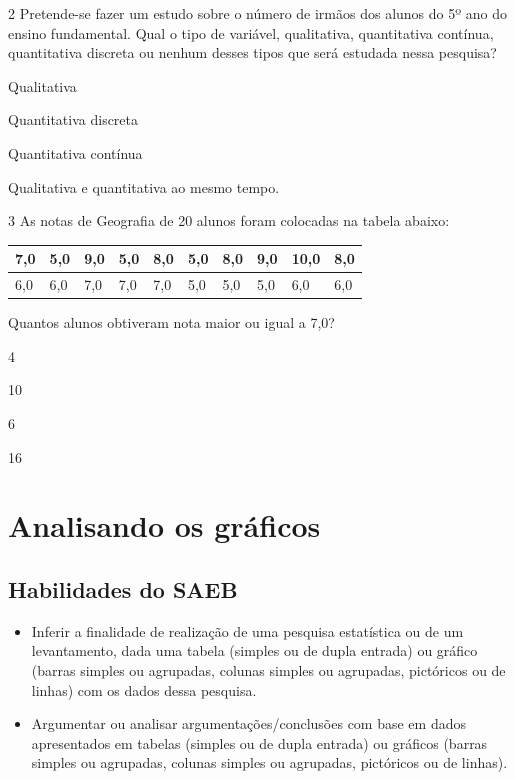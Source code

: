 \num{2} Pretende-se fazer um estudo sobre o número de irmãos dos alunos do
5º ano do ensino fundamental. Qual o tipo de variável, qualitativa,
quantitativa contínua, quantitativa discreta ou nenhum desses tipos que
será estudada nessa pesquisa?

\begin{escolha}
\item
  Qualitativa
\item
  Quantitativa discreta
\item
  Quantitativa contínua
\item
  Qualitativa e quantitativa ao mesmo tempo.
\end{escolha}


\num{3} As notas de Geografia de 20 alunos foram colocadas na tabela
abaixo:

\begin{longtable}[]{@{}llllllllll@{}}
\toprule
7,0 & 5,0 & 9,0 & 5,0 & 8,0 & 5,0 & 8,0 & 9,0 & 10,0 &
8,0\tabularnewline
\midrule
\endhead
6,0 & 6,0 & 7,0 & 7,0 & 7,0 & 5,0 & 5,0 & 5,0 & 6,0 & 6,0\tabularnewline
\bottomrule
\end{longtable}

Quantos alunos obtiveram nota maior ou igual a 7,0?

\begin{escolha}
\item
  4
\item
  10
\item
  6
\item
  16
\end{escolha}


\chapter{Analisando os gráficos}

\section*{Habilidades do SAEB}

\begin{itemize}
\item Inferir a finalidade de realização de uma pesquisa estatística ou de
um levantamento, dada uma tabela (simples ou de dupla entrada) ou
gráfico (barras simples ou agrupadas, colunas simples ou agrupadas,
pictóricos ou de linhas) com os dados dessa pesquisa.

\item Argumentar ou analisar argumentações/conclusões com base em dados
apresentados em tabelas (simples ou de dupla entrada) ou gráficos
(barras simples ou agrupadas, colunas simples ou agrupadas, pictóricos
ou de linhas).
\end{itemize}

